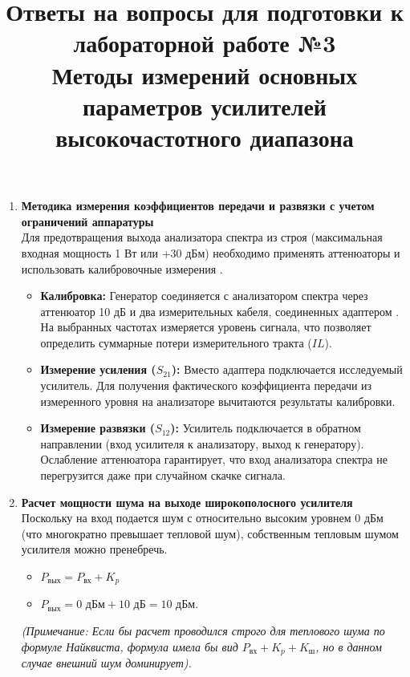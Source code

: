\documentclass[11pt, a4paper]{article}
\title{\textbf{Ответы на вопросы для подготовки к лабораторной работе №3}\\ \large Методы измерений основных параметров усилителей высокочастотного диапазона}
\author{}
\date{}
\begin{document}
\maketitle

\begin{enumerate}[label=\textbf{\arabic*.}]

    \item \textbf{Методика измерения коэффициентов передачи и развязки с учетом ограничений аппаратуры}\\
    Для предотвращения выхода анализатора спектра из строя (максимальная входная мощность 1 Вт или +30 дБм) необходимо применять аттенюаторы и использовать калибровочные измерения .
    \begin{itemize}
        \item \textbf{Калибровка:} Генератор соединяется с анализатором спектра через аттенюатор 10 дБ и два измерительных кабеля, соединенных адаптером . На выбранных частотах измеряется уровень сигнала, что позволяет определить суммарные потери измерительного тракта ($IL$).
        \item \textbf{Измерение усиления ($S_{21}$):} Вместо адаптера подключается исследуемый усилитель. Для получения фактического коэффициента передачи из измеренного уровня на анализаторе вычитаются результаты калибровки.
        \item \textbf{Измерение развязки ($S_{12}$):} Усилитель подключается в обратном направлении (вход усилителя к анализатору, выход к генератору). Ослабление аттенюатора гарантирует, что вход анализатора спектра не перегрузится даже при случайном скачке сигнала.
    \end{itemize}

    \item \textbf{Расчет мощности шума на выходе широкополосного усилителя}\\
    Поскольку на вход подается шум с относительно высоким уровнем 0 дБм (что многократно превышает тепловой шум), собственным тепловым шумом усилителя можно пренебречь.
    \begin{itemize}
        \item $P_{\text{вых}} = P_{\text{вх}} + K_{p}$
        \item $P_{\text{вых}} = 0 \text{ дБм} + 10 \text{ дБ} = 10 \text{ дБм}$.
    \end{itemize}
    \textit{(Примечание: Если бы расчет проводился строго для теплового шума по формуле Найквиста, формула имела бы вид $P_{\text{вх}} + K_p + K_{\text{ш}}$, но в данном случае внешний шум доминирует).}


\end{enumerate}
\end{document}
